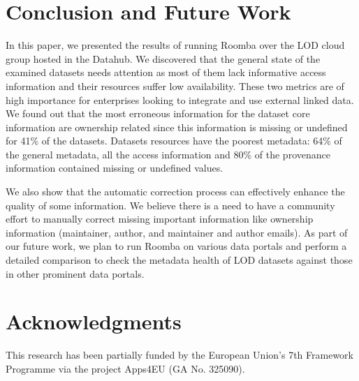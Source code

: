 \documentclass[runningheads,a4paper]{llncs}
\begin{document}
\section{Conclusion and Future Work}
\label{sec:conclusion}
In this paper, we presented the results of running Roomba over the LOD cloud group hosted in the Datahub. We discovered that the general state of the examined datasets needs attention as most of them lack informative access information and their resources suffer low availability. These two metrics are of high importance for enterprises looking to integrate and use external linked data. We found out that the most erroneous information for the dataset core information are ownership related since this information is missing or undefined for 41\% of the datasets. Datasets resources have the poorest metadata: 64\% of the general metadata, all the access information and 80\% of the provenance information contained missing or undefined values.

We also show that the automatic correction process can effectively enhance the quality of some information. We believe there is a need to have a community effort to manually correct missing important information like ownership information (maintainer, author, and maintainer and author emails). As part of our future work, we plan to run Roomba on various data portals and perform a detailed comparison to check the metadata health of LOD datasets against those in other prominent data portals.


\section*{Acknowledgments}
This research has been partially funded by the European Union's 7th Framework Programme via the project Apps4EU (GA No. 325090).


\nocite{*}

\end{document}

